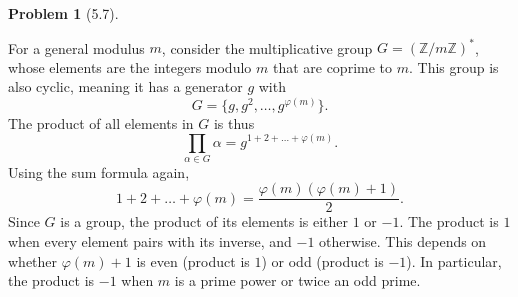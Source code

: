 \documentclass[12pt]{article}
\theoremstyle{definition}
\newtheorem{problem}{Problem}
\begin{document}
\begin{problem}[5.7]
\begin{enumerate}[label=(\alph*)]
              \begin{solution}
                For a general modulus $m$, consider the multiplicative group $G = (\mathbb{Z}/m\mathbb{Z})^*$, whose elements are the integers modulo $m$ that are coprime to $m$. This group is also cyclic, meaning it has a generator $g$ with 
                \[ G = \{ g, g^2, \dots, g^{\varphi(m)} \}. \]
                The product of all elements in $G$ is thus
                \[ \prod_{\alpha \in G} \alpha = g^{1+2+\dots+\varphi(m)}. \]
                Using the sum formula again,
                \[ 1+2+\dots+\varphi(m) = \frac{\varphi(m)(\varphi(m)+1)}{2}. \]
                Since $G$ is a group, the product of its elements is either $1$ or $-1$. The product is $1$ when every element pairs with its inverse, and $-1$ otherwise. This depends on whether $\varphi(m)+1$ is even (product is $1$) or odd (product is $-1$). In particular, the product is $-1$ when $m$ is a prime power or twice an odd prime.            
              \end{solution}
    \end{enumerate}
\end{problem}
\end{document}
